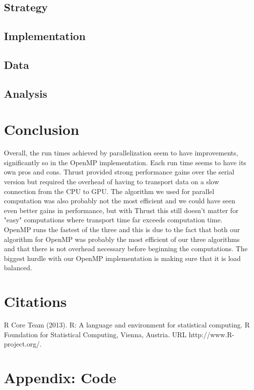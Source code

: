 \documentclass[titlepage, 11pt]{article}
\begin{document}
\subsection{Strategy}

\subsection{Implementation}


\subsection{Data}

\subsection{Analysis}




\section{Conclusion}
Overall, the run times achieved by parallelization seem to have improvements, significantly so in the OpenMP implementation. Each run time seems to have its own pros and cons. Thrust provided strong performance gains over the serial version but required the overhead of having to transport data on a slow connection from the CPU to GPU. The algorithm we used for parallel computation was also probably not the most efficient and we could have seen even better gains in performance, but with Thrust this still doesn't matter for "easy" computations where transport time far exceeds computation time. OpenMP runs the fastest of the three and this is due to the fact that both our algorithm for OpenMP was probably the most efficient of our three algorithms and that there is not overhead necessary before beginning the computations. The biggest hurdle with our OpenMP implementation is making sure that it is load balanced.


\section{Citations}
  R Core Team (2013). R: A language and environment for statistical computing. R Foundation for Statistical
  Computing, Vienna, Austria. URL http://www.R-project.org/.

\pagebreak
\appendix
\section{Appendix: Code}
\end{document}
